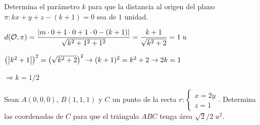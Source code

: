 \begin{ejre}
	Determina el parámetro $k$ para que la distancia al origen del plano $\pi:kx+y+z-(k+1)=0$ sea de $1$ unidad.
\end{ejre}
\begin{proofw}\renewcommand{\qedsymbol}{$\diamond$}	
	$d(\mathcal O,\pi)=\dfrac{\abs{m\cdot 0+1\cdot 0+1\cdot 0-(k+1)}}{\sqrt{k^2+1^2+1^2}}=\dfrac {k+1}{\sqrt{k^2+2}}=1\; u$
	
\noindent $\left(\abs{k^2+1}\right)^2=\left(\sqrt{k^2+2}\right)^2 \to (k+1)^2=k^2+2 \to 2k=1$

\noindent $\Rightarrow k=1/2$
\end{proofw}


\begin{ejre}
	Sean $A(0,0,0)$, $B(1,1,1)$ y $C$ un punto de la recta $r:\begin{cases}x=2y\\z=1\end{cases}$. Determina las coordenadas de $C$ para que el triángulo $ABC$ tenga área $\sqrt{2}/2\; u^2$.
\end{ejre}
